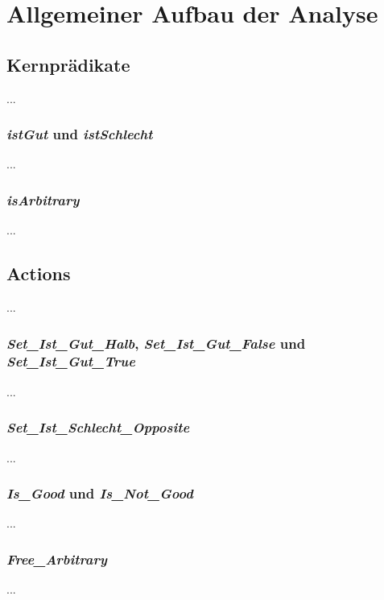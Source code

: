 \section{Allgemeiner Aufbau der Analyse}


\subsection{Kernprädikate}
...

\subsubsection{\emph{istGut} und \emph{istSchlecht}}
...

\subsubsection{\emph{isArbitrary}}
...


\subsection{Actions}
...

\subsubsection{\emph{Set\_Ist\_Gut\_Halb}, \emph{Set\_Ist\_Gut\_False} und \emph{Set\_Ist\_Gut\_True}}
...


\subsubsection{\emph{Set\_Ist\_Schlecht\_Opposite}}
...


\subsubsection{\emph{Is\_Good} und \emph{Is\_Not\_Good}}
...


\subsubsection{\emph{Free\_Arbitrary}}
...
